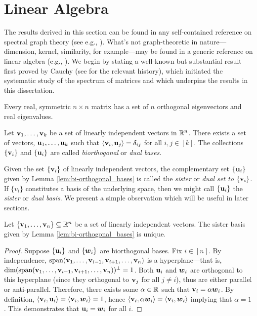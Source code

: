 \section{Linear Algebra}
\label{sec:background_linear}
The results derived in this section can be found in any self-contained reference on spectral graph theory (see e.g., \cite{spielman2009spectral,chung1997spectral}). What's not graph-theoretic in nature---dimension, kernel, similarity, for example---may be found in a generic reference on linear algebra (e.g.,  \cite{axler1997linear}). We begin by stating a well-known but substantial result first proved by Cauchy (see \cite{hawkins1975cauchy} for the relevant history), which initiated the systematic study of the spectrum of matrices and which underpins the results in this dissertation. 

\begin{theorem}
	\label{thm:spectral_theorem}
	Every real, symmetric $n\times n$ matrix has a set of $n$ orthogonal eigenvectors and real eigenvalues.  
\end{theorem}

\begin{lemma}
\label{lem:bi-orthogonal_bases}
Let $\vb{v}_1,\dots,\vb{v}_k$ be a set of linearly independent vectors in $\mathbb{R}^n$. There exists a set of vectors, $\vb{u}_1,\dots,\vb{u}_k$ such that $\langle \vb{v}_i,\vb{u}_j\rangle = \delta_{ij}$ for all $i,j\in[k]$. The collections $\{\vb{v}_i\}$ and $\{\vb{u}_i\}$ are called \emph{biorthogonal} or \emph{dual bases}.  
\end{lemma}

Given the set $\{\vb{v}_i\}$ of linearly independent vectors, the complementary set $\{\vb{u}_i\}$ given by Lemma \ref{lem:bi-orthogonal_bases} is called the \emph{sister} or \emph{dual set to $\{\vb{v}_i\}$}. If $\{v_i\}$ constitutes a basis of the underlying space, then we might call $\{\vb{u}_i\}$ the \emph{sister} or \emph{dual basis}.  We present a simple observation which will be useful in later sections. 

\begin{observation}
\label{obs:bi-orthogonal_unique}
Let $\{\vb{v}_1,\dots,\vb{v}_n\}\subseteq\mathbb{R}^n$ be a set of linearly independent vectors. The sister basis given by Lemma \ref{lem:bi-orthogonal_bases} is unique. 
\end{observation}
\begin{proof}
Suppose $\{\vb{u}_i\}$ and $\{\vb*{w}_i\}$ are biorthogonal bases. Fix $i\in[n]$. By independence, $\textnormal{span}(\vb{v}_1,\dots,\vb{v}_{i-1},\vb{v}_{i+1},\dots,\vb{v}_n)$ is a hyperplane---that is, $\dim(\textnormal{span}(\vb{v}_1,\dots,\vb{v}_{i-1},\vb{v}_{i+1},\dots,\vb{v}_n))^\perp=1$. Both $\vb{u}_i$ and $\vb*{w}_i$ are orthogonal to this hyperplane (since they orthogonal to $\vb{v}_j$ for all $j\neq i$), thus are either parallel or anti-parallel. Therefore, there exists some $\alpha\in\mathbb{R}$ such that $\vb{v}_i=\alpha\vb*{w}_i$. By definition, $\langle \vb{v}_i,\vb{u}_i\rangle = \langle \vb{v}_i,\vb*{w}_i\rangle =1$, hence $\langle \vb{v}_i,\alpha \vb*{w}_i\rangle = \langle \vb{v}_i,\vb*{w}_i\rangle$ implying that $\alpha=1$. This demonstrates that $\vb{u}_i=\vb*{w}_i$ for all $i$. 
\end{proof}

